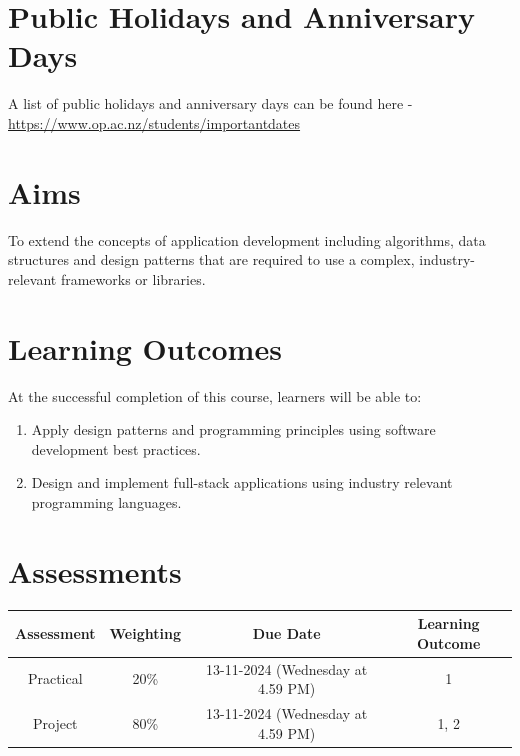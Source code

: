 \documentclass{article}
\begin{document}
\section*{Public Holidays and Anniversary Days}
A list of public holidays and anniversary days can be found here - \href{https://www.op.ac.nz/students/importantdates}{https://www.op.ac.nz/students/importantdates}

\section*{Aims}
To extend the concepts of application development including algorithms, data structures and design patterns that are required to use a complex, industry-relevant frameworks or libraries.

\section*{Learning Outcomes}
At the successful completion of this course, learners will be able to:
\begin{enumerate}
	\item Apply design patterns and programming principles using software development best practices.
	\item Design and implement full-stack applications using industry relevant programming languages.
\end{enumerate}

\section*{Assessments} 
\renewcommand{\arraystretch}{1.5}
\begin{tabular}{|c|c|c|c|}
	\hline 
	\textbf{Assessment}                                 & \textbf{Weighting} & \textbf{Due Date}            & \textbf{Learning Outcome} \\ \hline
	\small Practical & \small 20\%        & \small 13-11-2024 (Wednesday at 4.59 PM)   & \small 1                   \\ \hline
	\small Project                 & \small 80\%        & \small 13-11-2024 (Wednesday at 4.59 PM) \small  & \small 1, 2                   \\ \hline
\end{tabular}
\end{document}
